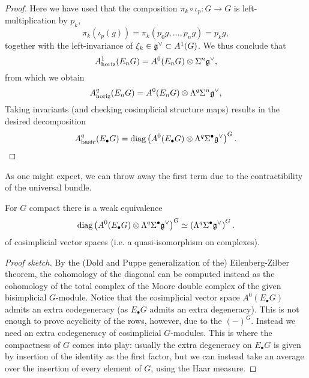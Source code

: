 \documentclass{amsart}
\DeclareMathOperator{\diag}{\text{diag}}
\begin{document}
\begin{proof}
    Here we have used that the composition $\pi_k\circ \iota_p: G\to G$ is
    left-multiplication by $p_k$,
    \begin{equation*}
        \pi_k(\iota_p(g)) = \pi_k(p_0g,\ldots,p_ng) = p_kg,
    \end{equation*}
    together with the left-invariance of $\xi_k\in\mathfrak g^\vee \subset A^1(G)$.
    We thus conclude that
    \begin{equation*}
        A^1_\text{horiz}(E_nG) = A^0(E_nG) \otimes \Sigma^n\mathfrak g^\vee,
    \end{equation*}
    from which we obtain
    \begin{equation*}
        A^q_\text{horiz}(E_nG) = A^0(E_nG) \otimes \Lambda^q\Sigma^n\mathfrak g^\vee,
    \end{equation*}
    Taking invariants (and checking cosimplicial structure maps) results in the 
    desired decomposition
    \begin{equation*}
        A^q_\text{basic}(E_\bullet G) = \diag \left( A^0(E_\bullet G)\otimes 
        \Lambda^q \Sigma^\bullet\fr g^\vee \right)^G.
    \end{equation*}
\end{proof}

As one might expect, we can throw away the first term due to the contractibility 
of the universal bundle.
\begin{lemma}
    For $G$ compact there is a weak equivalence 
    \begin{equation*}
        \diag\left( A^0(E_\bullet G) \otimes \Lambda^q\Sigma^\bullet\fr 
        g^\vee \right)^G \simeq \left( \Lambda^q\Sigma^\bullet\fr g^\vee 
        \right)^G.
    \end{equation*}
    of cosimplicial vector spaces (i.e. a quasi-isomorphism on complexes).
\end{lemma}
\begin{proof}[Proof sketch]
    By the (Dold and Puppe generalization of the) Eilenberg-Zilber theorem, the 
    cohomology of the diagonal can be computed instead as the cohomology of the 
    total complex of the Moore double complex of the given bisimplicial 
    $G$-module. Notice that the cosimplicial vector space $A^0(E_\bullet G)$
    admits an extra codegeneracy (as $E_\bullet G$ admits an extra degeneracy).
    This is not enough to prove acyclicity of the rows, however, due to the 
    $(-)^G$. Instead we need an extra codegeneracy of cosimplicial $G$-modules. 
    This is where the compactness of $G$ comes into play: usually the extra 
    degeneracy on $E_\bullet G$ is given by insertion of the identity as the 
    first factor, but we can instead take an average over the insertion of every 
    element of $G$, using the Haar measure.
\end{proof}
\end{document}
